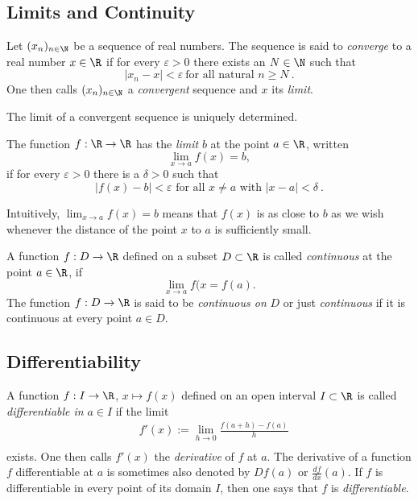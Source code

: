 
\subsection{Limits and Continuity}
\begin{definition}
  Let $(x_n)_{n\in \N}$ be a sequence of real numbers. The sequence is said to 
  \emph{converge} to a real number $x\in \R$ if for every $\varepsilon >0$ 
  there exists an $N\in \N$ such that 
  \[
     | x_n - x | < \varepsilon \: \text{for all natural } n \geq N \ . 
  \]
  One then calls $(x_n)_{n\in \N}$ a \emph{convergent} sequence and 
  $x$ its \emph{limit}. 
\end{definition}

\begin{proposition}
  The limit of a convergent sequence is uniquely determined. 
\end{proposition}

\begin{definition}
  The function $f: \R \rightarrow \R$  has the
  \emph{limit} $b$ at the point $a \in \R$, written 
  \[
    \lim_{x \rightarrow a} f(x) = b ,
  \]
  if for every $\varepsilon >0$  there is a $\delta >0$ such that 
  \[
      | f (x) - b | < \varepsilon \text{ for all } x \neq a
      \text{ with } | x - a | < \delta \ .
  \] 
\end{definition}
\begin{remark}
  Intuitively,  $\lim_{x \rightarrow a} f(x) = b$ means that 
  $f(x)$ is as close to $b$ as we wish whenever the distance 
  of the point $x$ to $a$ is sufficiently small.  
\end{remark}
\begin{definition}
  A function $f: D \rightarrow \R$ defined on a  subset $D \subset \R$ 
  is called \emph{continuous} at the point $a \in \R$, if 
  \[
    \lim_{x \rightarrow a} f(x = f(a) .
  \]
  \noindent
  The function $f : D \rightarrow \R$ 
  is said to be \emph{continuous on} $D$ or just \emph{continuous}
  if it is continuous  at every point $a \in D$.
\end{definition}

\subsection{Differentiability}
\begin{definition}
  A function $f:I \rightarrow \R$, $x \mapsto f(x)$ defined on an open interval
  $I\subset \R$  is called 
  \emph{differentiable in} 
  $a \in I$ if the limit
\begin{equation*}
  \begin{split}
   & f'(x) := \lim_{h\rightarrow 0} \frac{ f (a+h) - f(a)}{h} \\
  \end{split}
\end{equation*}
exists. One then calls  $f' (x)$ the \emph{derivative} of $f$ at $a$. 
The derivative of a  function $f$ differentiable at $a$ is sometimes also
denoted by $Df (a)$ or $\frac{d f}{d x} (a)$. 
If $f$  is differentiable in every  point of its domain $I$, then one says that $f$ is \emph{differentiable}.
\end{definition} 

